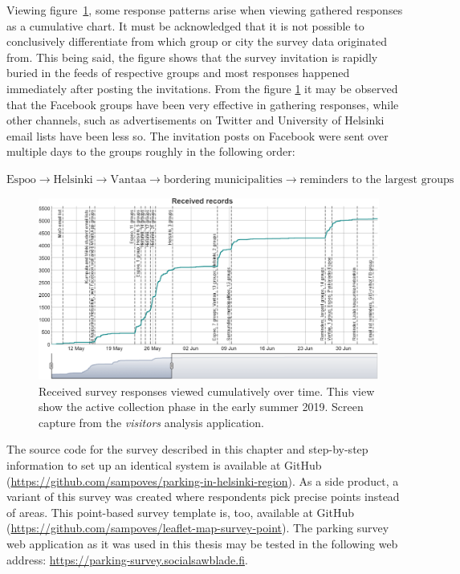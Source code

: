 Viewing figure~\ref{fig:thesis_visitors_app}, some response patterns arise when viewing gathered responses as a cumulative chart. It must be acknowledged that it is not possible to conclusively differentiate from which group or city the survey data originated from. This being said, the figure shows that the survey invitation is rapidly buried in the feeds of respective groups and most responses happened immediately after posting the invitations. From the figure \ref{fig:thesis_visitors_app} it may be observed that the Facebook groups have been very effective in gathering responses, while other channels, such as advertisements on Twitter and University of Helsinki email lists have been less so. The invitation posts on Facebook were sent over multiple days to the groups roughly in the following order: 

\begin{displayquote}
    $\text{Espoo}\rightarrow\text{Helsinki}\rightarrow\text{Vantaa}\rightarrow\text{bordering municipalities}\rightarrow\text{reminders to the largest groups}$
\end{displayquote}

\begin{figure}[H]%
    \includegraphics[width=\textwidth]{images/thesis_visitorsvis.png}
    \caption[Received responses viewed over time]{Received survey responses viewed cumulatively over time. This view show the active collection phase in the early summer 2019. Screen capture from the \textit{visitors} analysis application.}%
    \label{fig:thesis_visitors_app}%
\end{figure}

The source code for the survey described in this chapter and step-by-step information to set up an identical system is available at GitHub (\textcolor{blue}{\url{https://github.com/sampoves/parking-in-helsinki-region}}). As a side product, a variant of this survey was created where respondents pick precise points instead of areas. This point-based survey template is, too, available at GitHub (\textcolor{blue}{\url{https://github.com/sampoves/leaflet-map-survey-point}}). The parking survey web application as it was used in this thesis may be tested in the following web address: \textcolor{blue}{\url{https://parking-survey.socialsawblade.fi}}.

